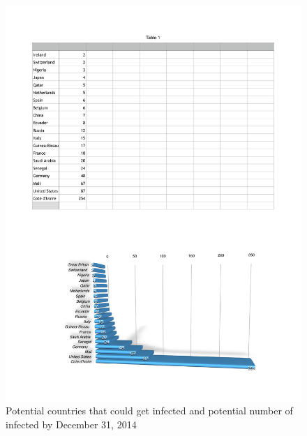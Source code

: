 \documentclass[10pt, journal,onecolumn]{IEEEtran}
\begin{document}
\begin{figure}[ht]
\centering
\includegraphics[scale=.5]{countriesinfected.pdf}
\caption{Potential countries that could get infected and potential number of infected by December 31, 2014}
\label{Fig:worldtrade}
\end{figure}













\end{document}
